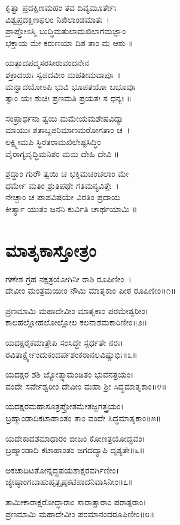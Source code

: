 ಕೃತ್ವಾ ಪ್ರದಕ್ಷಿಣಮಹಂ ತವ ದಿವ್ಯಮೂರ್ತೇಃ\\ವಿಶ್ವಪ್ರದಕ್ಷಿಣಫಲಂ ನಿಖಿಲಾಂಡಮಾತಃ~।\\
ಪ್ರಾಪ್ತೋಽಸ್ಮಿ ಬುದ್ಧಿಮತುಲಾಮಖಿಲಾಗಮಜ್ಞಾಂ \\ಭಕ್ತಾಯ ಮೇ ಕರುಣಯಾ ದಿಶ ತಾಂ ಮ ಆಶು ॥

ಯತ್ಪಾದಪದ್ಮಸರಸೀರುವಂದನೇನ \\ಶಕ್ರಾದಯಃ ಸ್ವಪದವೀಂ ಮಹತೀಮವಾಪುಃ~।\\
ಮನ್ವಾದಯೋಽಪಿ ಭುವಿ ಭೂಪತಯೋ ಬಭೂವುಃ\\ತ್ವಾಂ ಯಃ ಶುಚಿಃ ಪ್ರಣಮತಿ ಪ್ರಯತಃ ಸ ಧನ್ಯಃ ॥

ಸಂಪ್ರಾರ್ಥನಾ ತ್ವಯಿ ಮಮೇಯಮಶೇಷವಿದ್ಯಾ\-\\ಮಾಯುಃ ಶತಾಬ್ದಪರಿಮಾಣಮರೋಗತಾಂ ಚ~।\\
ಲಕ್ಷ್ಮೀಮಪಿ ಸ್ಥಿರತರಾಮಖಿಲೇಷ್ಟಸಿದ್ಧಿಂ \\ವೈರಾಗ್ಯವೃದ್ಧಿಮನಿಶಂ ಮಮ ದೇಹಿ ದೇವಿ ॥

ಶ್ರದ್ಧಾಂ ಗುರೌ ತ್ವಯಿ ಚ ಭಕ್ತಿಮಚಂಚಲಾಂ ಮೇ \\ಧರ್ಮೇ ಮತಿಂ ಶ್ರುತಿಪಥೇ ಗತಿಮನ್ಯವಿತ್ತೇ~।\\
ನೇಚ್ಛಾಂ ಚ ಪಾಪವಿಷಯೇ ವಿರತಿಂ ಪ್ರದಾಯ \\ಕೀರ್ತ್ಯಾ ಯುತಂ ಜನನಿ ಕುರ್ವಿತಿ ಚಾರ್ಥಯಾಮಿ ॥
\section{ಮಾತೃಕಾಸ್ತೋತ್ರಂ}
ಗಣೇಶ ಗ್ರಹ ನಕ್ಷತ್ರಯೋಗಿನೀ ರಾಶಿ ರೂಪಿಣೀಂ~।\\
ದೇವೀಂ ಮಂತ್ರಮಯೀಂ ನೌಮಿ ಮಾತೃಕಾಂ ಪೀಠ ರೂಪಿಣೀಂ॥೧॥

ಪ್ರಣಮಾಮಿ ಮಹಾದೇವೀಂ ಮಾತೃಕಾಂ ಪರಮೇಶ್ವರೀಂ।\\
ಕಾಲಹಲ್ಲೋಹಲೋಲ್ಲೋಲ ಕಲನಾಶಮಕಾರಿಣೀಂ॥೨॥

ಯದಕ್ಷರೈಕಮಾತ್ರೇಪಿ ಸಂಸಿದ್ಧೇ ಸ್ಪರ್ಧತೇ ನರಃ।\\
ರವಿತಾರ್ಕ್ಷ್ಯೇಂದುಕಂದರ್ಪಶಂಕರಾನಲವಿಷ್ಣುಭಿಃ॥೩॥

ಯದಕ್ಷರ ಶಶಿ ಜ್ಯೋತ್ಸ್ನಾಮಂಡಿತಂ ಭುವನತ್ರಯಂ।\\
ವಂದೇ ಸರ್ವೇಶ್ವರೀಂ ದೇವೀಂ ಮಹಾ ಶ್ರೀ ಸಿದ್ಧಮಾತೃಕಾಂ॥೪॥

ಯದಕ್ಷರಮಹಾಸೂತ್ರಪ್ರೋತಮೇತಜ್ಜಗತ್ತ್ರಯಂ।\\
ಬ್ರಹ್ಮಾಂಡಾದಿಕಟಾಹಾಂತಂ ತಾಂ ವಂದೇ ಸಿದ್ಧಮಾತೃಕಾಂ॥೫॥

ಯದೇಕಾದಶಮಾಧಾರಂ ಬೀಜಂ ಕೋಣತ್ರಯೋದ್ಭವಂ।\\
ಬ್ರಹ್ಮಾಂಡಾದಿ ಕಟಾಹಾಂತಂ ಜಗದದ್ಯಾಪಿ ದೃಶ್ಯತೇ॥೬॥

ಅಕಚಾದಿಟತೋನ್ನದ್ಧಪಯಶಾಕ್ಷರವರ್ಗಿಣೀಂ।\\
ಜ್ಯೇಷ್ಠಾಂಗಬಾಹುಹೃತ್ಪೃಷ್ಠಕಟಿಪಾದನಿವಾಸಿನೀಂ॥೭॥

ತಾಮೀಕಾರಾಕ್ಷರೋದ್ಧಾರಾಂ ಸಾರಾತ್ಸಾರಾಂ ಪರಾತ್ಪರಾಂ।\\
ಪ್ರಣಮಾಮಿ ಮಹಾದೇವೀಂ ಪರಮಾನಂದರೂಪಿಣೀಂ॥೮॥

